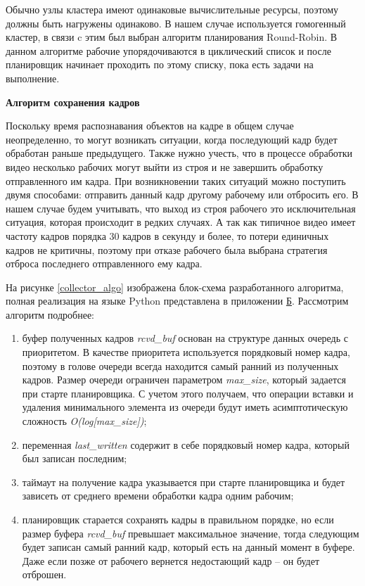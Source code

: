 Обычно узлы кластера имеют одинаковые вычислительные ресурсы, поэтому должны быть нагружены одинаково. В нашем случае 
используется гомогенный кластер, в связи c этим был выбран алгоритм планирования Round-Robin. В данном алгоритме рабочие
упорядочиваются в циклический список и после планировщик начинает проходить по этому списку, пока есть задачи на выполнение.

\textbf{Алгоритм сохранения кадров}

Поскольку время распознавания объектов на кадре в общем случае неопределенно, то могут возникать ситуации, когда последующий кадр
будет обработан раньше предыдущего. Также нужно учесть, что в процессе обработки видео несколько рабочих могут выйти из 
строя и не завершить обработку отправленного им кадра. При возникновении таких ситуаций можно поступить двумя способами:
отправить данный кадр другому рабочему или отбросить его. В нашем случае будем учитывать, что выход из строя рабочего это
исключительная ситуация, которая происходит в редких случаях. А так как типичное видео имеет частоту кадров порядка 30 кадров
в секунду и более, то потери единичных кадров не критичны, поэтому при отказе рабочего была выбрана
стратегия отброса последнего отправленного ему кадра.

На рисунке \ref{collector_algo} изображена блок-схема разработанного алгоритма, полная реализация на языке Python 
представлена в приложении \hyperlink{b-app}{Б}. Рассмотрим алгоритм подробнее:

\begin{enumerate}
\item буфер полученных кадров \emph{rcvd\_buf} основан на структуре данных очередь с приоритетом. В качестве приоритета 
используется порядковый номер кадра, поэтому в голове очереди всегда находится самый ранний из полученных кадров. Размер 
очереди ограничен параметром \emph{max\_size}, который задается при старте планировщика. С учетом этого получаем, что 
операции вставки и удаления минимального элемента из очереди будут иметь асимптотическую сложность \emph{O(log[max\_size])};
\item переменная \emph{last\_written} содержит в себе порядковый номер кадра, который был записан последним;
\item таймаут на получение кадра указывается при старте планировщика и будет зависеть от среднего времени 
обработки кадра одним рабочим;
\item планировщик старается сохранять кадры в правильном порядке, но если размер буфера \emph{rcvd\_buf} превышает
максимальное значение, тогда следующим будет записан самый ранний кадр, который есть на данный момент в буфере. Даже 
если позже от рабочего вернется недостающий кадр -- он будет отброшен.
\end{enumerate}

